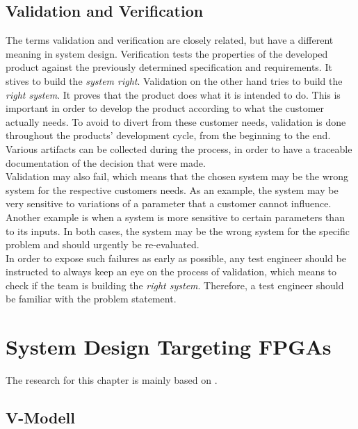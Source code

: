 \subsection{Validation and Verification}

The terms validation and verification are closely related, but have a different meaning in system design.
Verification tests the properties of the developed product against the previously determined specification and requirements.
It stives to build the \textit{system right}.
Validation on the other hand tries to build the \textit{right system}.
It proves that the product does what it is intended to do.
This is important in order to develop the product according to what the customer actually needs.
To avoid to divert from these customer needs, validation is done throughout the products' development cycle, from the beginning to the end.
Various artifacts can be collected during the process, in order to have a traceable documentation of the decision that were made.\\

Validation may also fail, which means that the chosen system may be the wrong system for the respective customers needs.
As an example, the system may be very sensitive to variations of a parameter that a customer cannot influence.
Another example is when a system is more sensitive to certain parameters than to its inputs.
In both cases, the system may be the wrong system for the specific problem and should urgently be re-evaluated.\\

In order to expose such failures as early as possible, any test engineer should be instructed to always keep an eye on the process of validation, which means to check if the team is building the \textit{right system}.
Therefore, a test engineer should be familiar with the problem statement.

\section{System Design Targeting FPGAs}
The research for this chapter is mainly based on \cite{GesslerRalf2014EES}.

\subsection{V-Modell}

